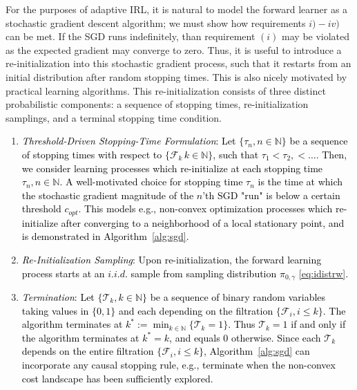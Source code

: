\documentclass[journal,onecolumn]{IEEEtran}
\newcommand{\N}{\mathbb{N}}
\newcommand{\ids}{\pi}
\newcommand{\idw}{\gamma}
\newcommand{\isp}{0,\idw}
\newcommand{\idistrw}{\ids_{\isp}}
\newcommand{\sgdtm}{c_{opt}}
\newcommand{\ks}{k^*}
\begin{document}
{{For the purposes of adaptive IRL, it is natural to model the forward learner as a stochastic gradient descent algorithm; we must show how requirements $i)-iv)$ can be met. If the SGD runs indefinitely, than requirement $(i)$ may be violated as the expected gradient may converge to zero. Thus, it is useful to introduce a re-initialization into this stochastic gradient process, such that it restarts from an initial distribution after random stopping times. This is also nicely motivated by practical learning algorithms. This re-initialization consists of three distinct probabilistic components: a sequence of  stopping times, re-initialization samplings, and a terminal stopping time condition.}
\begin{enumerate}[label=\roman*)]
    \item \textcolor{black}{\textit{Threshold-Driven Stopping-Time Formulation}: Let $\{\tau_n,n\in\N\}$ be a sequence of stopping times with respect to $\{\mathcal{F}_k\, k\in\N\}$, such that $\tau_1 < \tau_2, < \dots $. Then, we consider learning processes which re-initialize at each stopping time $\tau_n, n\in\N$. A well-motivated choice for stopping time $\tau_n$ is the time at which the stochastic gradient magnitude of the $n$'th SGD "run" is below a certain threshold $\sgdtm$. This models e.g., non-convex optimization processes which re-initialize after converging to a neighborhood of a local stationary point, and is demonstrated in Algorithm~\ref{alg:sgd}. }
    
    \item \textcolor{black}{\textit{Re-Initialization Sampling}: Upon re-initialization, the forward learning process starts at an $i.i.d.$ sample from sampling distribution $\idistrw$ \eqref{eq:idistrw}. }

    \item \textcolor{black}{\textit{Termination}: Let $\{\mathcal{T}_k, k\in\N\}$ be a sequence of binary random variables taking values in $\{0,1\}$ and each depending on the filtration $\{\mathcal{F}_i, i\leq k\}$. The algorithm terminates at $\ks := \min_{k\in\N}\{\mathcal{T}_k = 1\}$. Thus $\mathcal{T}_k = 1$ if and only if the algorithm terminates at $\ks = k$, and equals $0$ otherwise. Since each $\mathcal{T}_k$ depends on the entire filtration $\{\mathcal{F}_i, i\leq k\}$, Algorithm~\ref{alg:sgd} can incorporate any causal stopping rule, e.g., terminate when the non-convex cost landscape has been sufficiently explored.}
\end{enumerate} 

}
\end{document}
